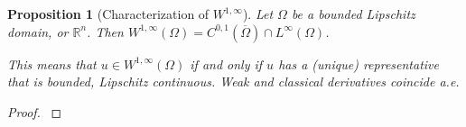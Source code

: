 \documentclass[english,a4paper,10pt,oneside]{scrbook}	%
\theoremstyle{break}
\newtheorem{lemma}[equation]{Lemma}
\newtheorem{prop}[equation]{Proposition}
\newenvironment{mproof}[1][\proofname]{%
  \begin{proof}[#1]$ $\par\nobreak\ignorespaces
}{%
  \end{proof}
}
\renewcommand*{\proofname}{Proof}
\theoremstyle{remark}
\newcommand{\mR}{\mathbb{R}}
\newcommand{\norm}[1]{\left\lVert#1\right\rVert}
\begin{document}
\begin{appendices}
%
%
%
%
%
%
%
%

\begin{prop}[Characterization of $W^{1,\infty}$]
\label{prop:lip}
Let $\Omega$ be a bounded Lipschitz domain, or $\mathbb{R}^n$. Then $W^{1,\infty}(\Omega) = C^{0,1}(\overline{\Omega})\cap L^\infty(\Omega)$.

This means that $u\in W^{1,\infty}(\Omega)$ if and only if $u$ has a (unique) representative that is bounded, Lipschitz continuous. Weak and classical derivatives coincide a.e.
\end{prop}
\begin{mproof}


\end{mproof}
\end{appendices}
\end{document}
